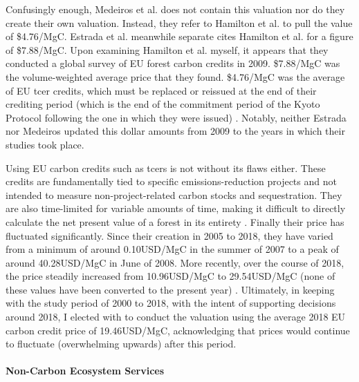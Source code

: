 Confusingly enough, Medeiros et al. does not contain this valuation nor do they create their own valuation. Instead, they refer to Hamilton et al. \cite{hamiltonStateForestCarbon2010} to pull the value of \$4.76/MgC. Estrada et al. meanwhile separate cites Hamilton et al. for a figure of \$7.88/MgC. Upon examining Hamilton et al. myself, it appears that they conducted a global survey of EU forest carbon credits in 2009. \$7.88/MgC was the volume-weighted average price that they found. \$4.76/MgC was the average of EU \ac{tcer} credits, which must be replaced or reissued at the end of their crediting period (which is the end of the commitment period of the Kyoto Protocol following the one in which they were issued) \cite{salinasNonpermanence2011}. Notably, neither Estrada nor Medeiros updated this dollar amounts from 2009 to the years in which their studies took place. 

Using EU carbon credits such as \acp{tcer} is not without its flaws either. These credits are fundamentally tied to specific emissions-reduction projects and not intended to measure non-project-related carbon stocks and sequestration. They are also time-limited for variable amounts of time, making it difficult to directly calculate the net present value of a forest in its entirety \cite{salinasNonpermanence2011}. Finally their price has fluctuated significantly. Since their creation in 2005 to 2018, they have varied from a minimum of around 0.10USD/MgC in the summer of 2007 to a peak of around 40.28USD/MgC in June of 2008. More recently, over the course of 2018, the price steadily increased from 10.96USD/MgC to 29.54USD/MgC (none of these values have been converted to the present year) \cite{EUCarbonPermits2023}. Ultimately, in keeping with the study period of 2000 to 2018, with the intent of supporting decisions around 2018, I elected with to conduct the valuation using the average 2018 EU carbon credit price of 19.46USD/MgC, acknowledging that prices would continue to fluctuate (overwhelming upwards) after this period. 

\paragraph{Non-Carbon Ecosystem Services} \leavevmode\newline

